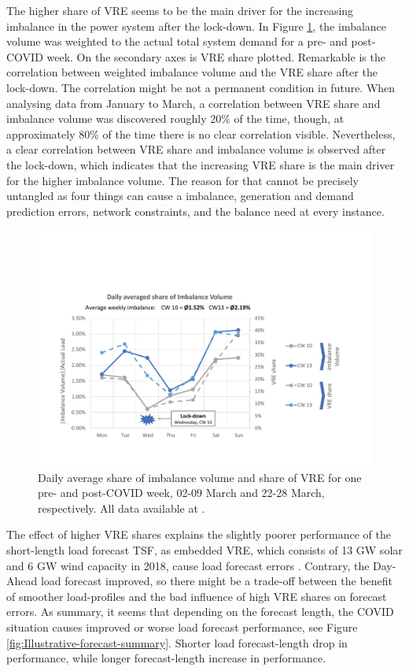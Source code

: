 \documentclass[energies,article,submit,moreauthors,pdftex]{Definitions/mdpi}
\begin{document}
The higher share of VRE seems to be the main driver for the increasing imbalance in the power system after the lock-down. In Figure \ref{fig:ImbalanceVolume-daily}, the imbalance volume was weighted to the actual total system demand for a pre- and post-COVID week. On the secondary axes is VRE share plotted. Remarkable is the correlation between weighted imbalance volume and the VRE share after the lock-down. The correlation might be not a permanent condition in future. When analysing data from January to March, a correlation between VRE share and imbalance volume was discovered roughly 20\% of the time, though, at approximately 80\% of the time there is no clear correlation visible. Nevertheless, a clear correlation between VRE share and imbalance volume is observed after the lock-down, which indicates that the increasing VRE share is the main driver for the higher imbalance volume. The reason for that cannot be precisely untangled as four things can cause a imbalance, generation and demand prediction errors, network constraints, and the balance need at every instance. 

\begin{figure}[H]
\centering
\hspace{-25pt}\includegraphics[trim={0cm 2cm 2.5cm 4cm},clip,width=1\textwidth]{Graphics/Illustration-Imbalance-2weeks.pdf}
\caption{Daily average share of imbalance volume and share of VRE for one pre- and post-COVID week, 02-09 March and 22-28 March, respectively. All data available at \protect\cite{ELEXON2020ELEXONBMRS}.}\label{fig:ImbalanceVolume-daily}
\end{figure} 

The effect of higher VRE shares explains the slightly poorer performance of the short-length load forecast TSF, as embedded VRE, which consists of 13 GW solar and 6 GW wind capacity in 2018,  cause load forecast errors \cite{NationalgridESO2018QuarterlyMarch18, NationalGridESO2019EnergyRoadmap}. Contrary, the Day-Ahead load forecast improved, so there might be a trade-off between the benefit of smoother load-profiles and the bad influence of high VRE shares on forecast errors. As summary, it seems that depending on the forecast length, the COVID situation causes improved or worse load forecast performance, see Figure \ref{fig:Illustrative-forecast-summary}. Shorter load forecast-length drop in performance, while longer forecast-length increase in performance.
\end{document}

